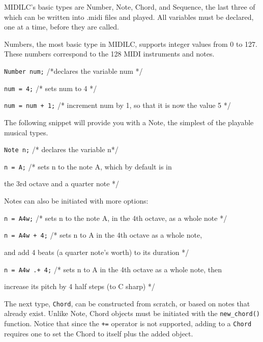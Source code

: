 \documentclass[12pt,A4]{book}
\begin{document}
MIDILC’s basic types are Number, Note, Chord, and Sequence, the last three of which can be written into .midi files and played. All variables must be declared, one at a time, before they are called.


\noindent Numbers, the most basic type in MIDILC, supports integer values from 0 to 127. These numbers correspond to the 128 MIDI instruments and notes.

\vspace{5 mm}

\verb|Number num;| /*declares the variable num */

\verb|num = 4;| /* sets num to 4 */

\verb|num = num + 1;| /* increment num by 1, so that it is now the value 5 */

\vspace{5 mm}

\noindent The following snippet will provide you with a Note, the simplest of the playable musical types.

\vspace{5 mm}

\verb|Note n;| /* declares the variable n*/

\verb|n = A;| /* sets n to the note A, which by default is in 

\indent \indent \indent the 3rd octave and a quarter note */

\vspace{5 mm}

\noindent Notes can also be initiated with more options:

\vspace{5 mm}

\verb|n = A4w;| /* sets n to the note A, in the 4th octave, as a whole note */

\verb|n = A4w + 4;| /* sets n to A in the 4th octave as a whole note, 

\indent \indent \indent and add 4 beats (a quarter note’s worth) to its duration */

\verb|n = A4w .+ 4;| /* sets n to A in the 4th octave as a whole note, then 

\indent \indent \indent increase its pitch by 4 half steps (to C sharp) */

\vspace{5 mm}

\noindent The next type, \verb|Chord|, can be constructed from scratch, or based on notes that already exist. Unlike Note, Chord objects must be initiated with the \verb|new_chord()| function. Notice that since the \verb|+=| operator is not supported, adding to a \verb|Chord| requires one to set the Chord to itself plus the added object.
\end{document}
